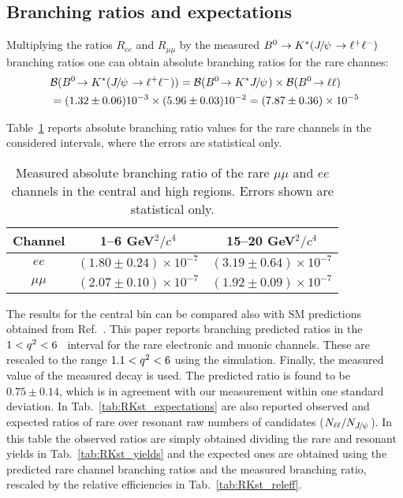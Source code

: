 \subsection{Branching ratios and expectations}

Multiplying the ratios $R_{ee}$ and $R_{\mu\mu}$ by the measured $\Bz\to\Kstar (\jpsi\to\ell^+\ell^-)$~\cite{PDG2014}
branching ratios one can obtain absolute branching ratios for the rare channes:
%
\begin{equation}
\begin{split}
&\BR(\decay{\Bz}{\Kstar(\jpsi\to\ell^+\ell^-)}) = \BR(\decay{\Bz}{\Kstar\jpsi}) \times \BR(\decay{\Bz}{\ell\ell}) \\
& = (1.32 \pm 0.06) 10^{-3} \times (5.96 \pm 0.03) 10^{-2} = (7.87 \pm 0.36) \times 10^{-5}
\end{split}
\end{equation}

Table~\ref{tab:RKst_abs_BR} reports absolute branching ratio values for the rare channels in the considered 
\qsq intervals, where the errors are statistical only.
%
\begin{table}[h]
\centering
\caption{Measured absolute branching ratio of the rare $\mu\mu$ and $ee$ channels in
the central and high \qsq regions. Errors shown are statistical only. }
\begin{tabular}{|c|c|c|}
\hline
 Channel 			& 1--6 GeV$^2/c^4$ & 15--20 GeV$^2/c^4$\\ \hline
$ee$ 		& $( 1.80  \pm  0.24 )\times 10^{-7}$ 	& $( 3.19  \pm  0.64 )\times 10^{-7}$ \\
 $\mu\mu$ 	& $( 2.07  \pm  0.10 )\times 10^{-7}$ 	& $( 1.92  \pm  0.09 )\times 10^{-7}$ \\
\hline 
 \end{tabular}

\label{tab:RKst_abs_BR}
\end{table}

The results for the central \qsq bin can be compared also with SM predictions obtained from Ref.~\cite{Ali:2002jg}.
This paper reports branching predicted ratios in the \mbox{$1 < {q^2} < 6$~\gevgevcccc} interval
for the rare electronic and muonic channels. These are rescaled to the range $1.1 < {q^2} < 6$ \gevgevcccc
using the simulation. Finally, the measured value of the measured \decay{\Bz}{\Kstar(\jpsi\to\ell^+\ell^-)}
decay is used. The predicted ratio is found to be $0.75 \pm 0.14$,
which is in agreement with our measurement within one standard deviation.
In Tab.~\ref{tab:RKst_expectations} are also reported observed and expected ratios of rare
over resonant raw numbers of candidates ($N_{\ell\ell} / N_{\jpsi}$). In this table the observed ratios
are simply obtained dividing the rare and resonant yields in Tab.~\ref{tab:RKst_yields}
and the expected ones are obtained using the predicted rare channel branching ratios and 
the measured \decay{\Bz}{\Kstar(\jpsi\to\ell^+\ell^-)} branching ratio, rescaled by the
relative efficiencies in Tab.~\ref{tab:RKst_releff}.  

